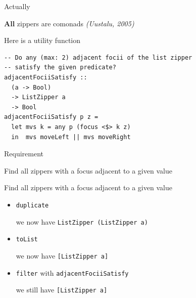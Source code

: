 \begin{frame}[fragile]
\begin{block}{Actually}
\begin{center}
\textbf{All} zippers are comonads \emph{(Uustalu, 2005)}
\end{center}
\end{block}
\end{frame}

\begin{frame}[fragile]
\begin{block}{Here is a utility function}
\begin{center}
\begin{lstlisting}[style=haskell]
-- Do any (max: 2) adjacent focii of the list zipper
-- satisfy the given predicate?
adjacentFociiSatisfy ::
  (a -> Bool)
  -> ListZipper a
  -> Bool
adjacentFociiSatisfy p z =
  let mvs k = any p (focus <$> k z)
  in  mvs moveLeft || mvs moveRight
\end{lstlisting}
\end{center}
\end{block}
\end{frame}

\begin{frame}[fragile]
\begin{block}{Requirement}
\begin{center}
Find all zippers with a focus adjacent to a given value
\end{center}
\end{block}
\end{frame}

\begin{frame}[fragile]
\begin{block}{Find all zippers with a focus adjacent to a given value}
\begin{itemize}
  \item<1-> \lstinline{duplicate}

            we now have \lstinline{ListZipper (ListZipper a)}
  \item<2-> \lstinline{toList}

            we now have \lstinline{[ListZipper a]}
  \item<3-> \lstinline{filter} with \lstinline{adjacentFociiSatisfy}

            we still have \lstinline{[ListZipper a]}
\end{itemize}
\end{block}
\end{frame}

